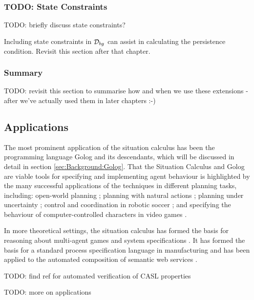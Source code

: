 \subsubsection{TODO: State Constraints}

TODO: briefly discuss state constraints? \citep{Lin94-StateConstraints}

Including state constraints in $\mathcal{D}_{bg}$ can assist in calculating
the persistence condition. Revisit this section after that chapter.


\subsubsection{Summary}

TODO: revisit this section to summarise how and when we use these
extensions - after we've actually used them in later chapters :-)


\subsection{Applications}

The most prominent application of the situation calculus has been
the programming language Golog \citep{levesque97golog} and its descendants,
which will be discussed in detail in section \ref{sec:Background:Golog}.
That the Situation Calculus and Golog are viable tools for specifying
and implementing agent behaviour is highlighted by the many successful
applications of the techniques in different planning tasks, including:
open-world planning \citep{Finzi00open_world_sitcalc}; planning with
natural actions \citep{pirri00planning_nat_acts}; planning under
uncertainty \citep{baier03golog_planning}; control and coordination
in robotic soccer \citep{Ferrein2005readylog}; and specifying the
behaviour of computer-controlled characters in video games \citep{jacobs05unrealgolog}.

In more theoretical settings, the situation calculus has formed the
basis for reasoning about multi-agent games \citep{delgrande01sitcalc_cleudo}
and system specifications \citep{shapiro02casl,lesperance05ecasl}.
It has formed the basis for a standard process specification language
in manufacturing \citep{gruninger04psl} and has been applied to the
automated composition of semantic web services \citep{mcilraith02golog_web_services}.

TODO: find ref for automated verification of CASL properties

TODO: more on applications


